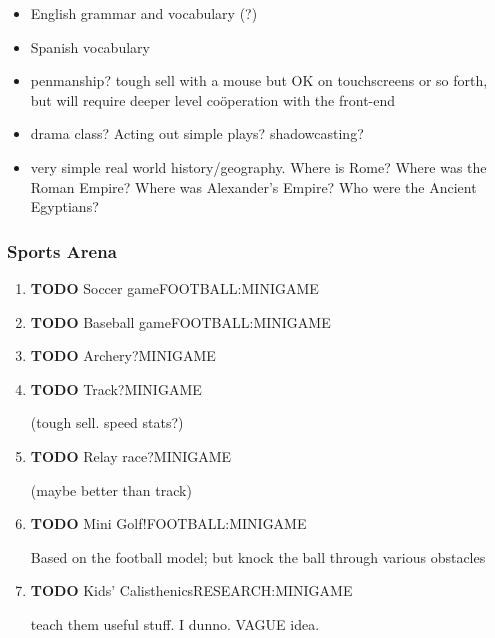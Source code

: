 \documentclass[11pt]{article}
\begin{document}
\begin{enumerate}
\begin{enumerate}
\begin{itemize}
\item English grammar and vocabulary (?)

\item Spanish vocabulary

\item penmanship? tough sell with a mouse but OK on touchscreens or so
forth, but will require deeper level coöperation with the front-end

\item drama class? Acting out simple plays? shadowcasting?

\item very simple real world history/geography. Where is Rome? Where was
the Roman Empire? Where was Alexander's Empire? Who were the
Ancient Egyptians?
\end{itemize}
\end{enumerate}
\subsubsection{Sports Arena}
\label{sec-4-1-3}

\begin{enumerate}
\item {\bfseries\sffamily TODO} Soccer game\hfill{}\textsc{FOOTBALL:MINIGAME}
\label{sec-4-1-3-0-1}

\item {\bfseries\sffamily TODO} Baseball game\hfill{}\textsc{FOOTBALL:MINIGAME}
\label{sec-4-1-3-0-2}

\item {\bfseries\sffamily TODO} Archery?\hfill{}\textsc{MINIGAME}
\label{sec-4-1-3-0-3}

\item {\bfseries\sffamily TODO} Track?\hfill{}\textsc{MINIGAME}
\label{sec-4-1-3-0-4}

(tough sell. speed stats?)
\item {\bfseries\sffamily TODO} Relay race?\hfill{}\textsc{MINIGAME}
\label{sec-4-1-3-0-5}

(maybe better than track)
\item {\bfseries\sffamily TODO} Mini Golf!\hfill{}\textsc{FOOTBALL:MINIGAME}
\label{sec-4-1-3-0-6}

Based on the football model; but knock the ball through various
obstacles 
\item {\bfseries\sffamily TODO} Kids' Calisthenics\hfill{}\textsc{RESEARCH:MINIGAME}
\label{sec-4-1-3-0-7}

teach them useful stuff. I dunno. VAGUE idea.


\end{enumerate}
\end{enumerate}
\end{document}
